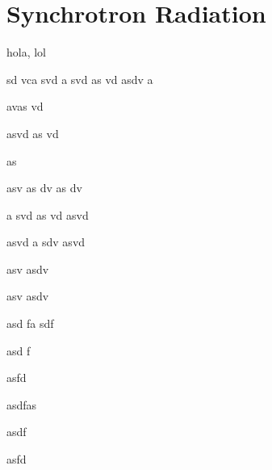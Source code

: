 \chapter{Synchrotron Radiation}

\label{c:sr} %

\lhead{\ref{c:sr}} %

hola, lol


sd
vca
svd
a
svd
as
vd
asdv
a

avas
vd

asvd
as
vd

as

asv
as
dv
as
dv

a
svd
as
vd
asvd



asvd
a
sdv
asvd


asv
asdv



asv
asdv


asd
fa
sdf

asd
f

asfd

asdfas

asdf

asfd
